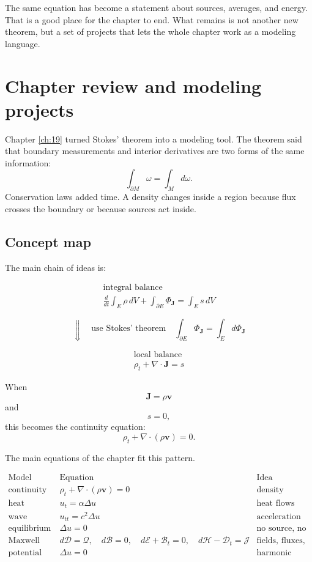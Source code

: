 The same equation has become a statement about sources, averages, and energy.  That is
a good place for the chapter to end.  What remains is not another new theorem, but a
set of projects that lets the whole chapter work as a modeling language.

\section{Chapter review and modeling projects}
\label{sec:19.6}

Chapter \ref{ch:19} turned Stokes' theorem into a modeling tool.  The theorem said
that boundary measurements and interior derivatives are two forms of the same
information:
\[
    \int_{\partial M}\omega=\int_M d\omega.
\]
Conservation laws added time.  A density changes inside a region because flux crosses
the boundary or because sources act inside.

\subsection{Concept map}

The main chain of ideas is:

\[
\boxed{
\begin{array}{c}
\text{integral balance}\\[1mm]
\displaystyle
\frac{d}{dt}\int_E \rho\,dV
+
\int_{\partial E}\Phi_{\mathbf J}
=
\int_E s\,dV
\end{array}
}
\]

\[
\Downarrow\quad\text{use Stokes' theorem}\quad
\int_{\partial E}\Phi_{\mathbf J}=\int_E d\Phi_{\mathbf J}
\]

\[
\boxed{
\begin{array}{c}
\text{local balance}\\[1mm]
\displaystyle
\rho_t+\nabla\cdot\mathbf J=s
\end{array}
}
\]

When
\[
    \mathbf J=\rho\mathbf v
\]
and
\[
    s=0,
\]
this becomes the continuity equation:
\[
\boxed{
    \rho_t+\nabla\cdot(\rho\mathbf v)=0.
}
\]

The main equations of the chapter fit this pattern.

\[
\begin{array}{c|c|c}
\text{Model} & \text{Equation} & \text{Idea} \\ \hline
\text{continuity} &
\rho_t+\nabla\cdot(\rho\mathbf v)=0 &
\text{density transported by a flow}\\[1mm]
\text{heat} &
u_t=\alpha\Delta u &
\text{heat flows down the gradient}\\[1mm]
\text{wave} &
u_{tt}=c^2\Delta u &
\text{acceleration responds to curvature}\\[1mm]
\text{equilibrium} &
\Delta u=0 &
\text{no source, no time change}\\[1mm]
\text{Maxwell} &
d\mathcal D=\mathcal Q,\quad d\mathcal B=0,\quad
d\mathcal E+\mathcal B_t=0,\quad
d\mathcal H-\mathcal D_t=\mathcal J
&
\text{fields, fluxes, currents, and charge}\\[1mm]
\text{potential theory} &
\Delta u=0 &
\text{harmonic balance and least energy}
\end{array}
\]


